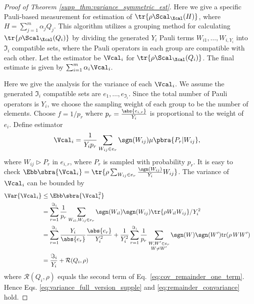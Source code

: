 \documentclass[prl,aps,notitlepage,superscriptaddress,showpacs,nofootinbib]{revtex4-2}
\begin{document}
\begin{proof}[Proof of Theorem \ref{supp_thm:variance_symmetric_est}]
Here we give a specific Pauli-based measurement for estimation of $\tr{\rho \Scal_{\Xcal} (H)}$, where $H = \sum_{j=1}^m \alpha_j Q_j$.
This algorithm utilizes a grouping method for calculating $\tr{\rho \Scal_{\Xcal} (Q_i)}$ by dividing the generated $Y_i$ Pauli terms $W_{i1},\ldots, W_{i,Y_i}$ into $\Im_i$ compatible sets, where the Pauli operators in each group are compatible with each other. Let the estimator be $\Vcal_i$ for $\tr{\rho \Scal_{\Xcal} (Q_i)}$. The final estimate is given by $ \sum_{i=1}^m \alpha_i \Vcal_i$.

Here we give the analysis for the variance of each $\Vcal_i$. We assume the generated $\Im_i$ compatible sets are $e_{1},\ldots, e_{\Im_i}$. Since the total number of Pauli operators is $Y_i$, we choose the sampling weight of each group to be the number of elements. Choose $f = 1/p_r$ where $p_r = \frac{\abs{e_{i,r}}}{Y_i}$ is proportional to the weight of $e_i$. Define estimator
\begin{equation}
    \Vcal_i = \frac{1}{Y_ip_r}\sum_{W_{ij} \in e_r}\sgn(W_{ij}) \mu\pbra{P_r|W_{ij}},
\end{equation}
where $ W_{ij} \triangleright P_r $ in $e_{i,r}$, where $P_r$ is sampled with probability $p_r$. It is easy to check $\Ebb\sbra{\Vcal_i} = \tr{\rho \sum_{W_{ij} \in e_r} \frac{\sgn(W_{ij})}{Y_i} W_{ij}}$. The variance of $\Vcal_i$ can be bounded by
\begin{align}
\Var{\Vcal_i} &\leq \Ebb\sbra{\Vcal_i^2}\\
&= \sum_{r=1}^{\Im_i} \frac{1}{p_r} \sum_{W_{il},W_{ij}\in e_{r}} \sgn(W_{il}) \sgn(W_{ij})\tr{\rho W_{il} W_{ij}}/Y_i^2\\
&= \sum_{r=1}^{\Im_i} \frac{Y_i}{\abs{e_{r}}} \frac{\abs{e_{r}}}{Y_i^2} + \frac{1}{ Y_i^2}
\sum_{r=1}^{\Im_i}\frac{1}{p_r}
\sum_{\substack{W,W'\in e_{r}\\ W\neq W'}} \sgn(W)\sgn(W')
\text{tr}(\rho\,WW')
\label{eq:cov_remainder_one_term}\\
&=\frac{\Im_i}{Y_i} + \mathcal{R}(Q_i,\rho)
\end{align}
where $\mathcal{R}( Q_i,\rho)$ equals the second term of Eq.~\eqref{eq:cov_remainder_one_term}. Hence Eqs. \eqref{eq:variance_full_version_supple} and \eqref{eq:remainder_convariance} hold.

\end{proof}
\end{document}
